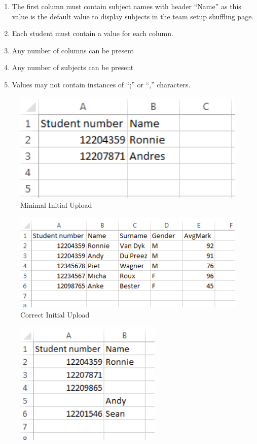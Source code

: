 \begin{enumerate}
\begin{itemize}
\begin{enumerate}
		\item The first column must contain subject names with header ``Name'' as this value is the default value to display subjects in the team setup shuffling page.
		\item Each student must contain a value for each column.
		\item Any number of columns can be present
		\item Any number of subjects can be present
		\item Values may not contain instances of ``;'' or ``,'' characters.
						
	\end{enumerate}
 \begin{figure}[H] 
	\centering
	\includegraphics[width=13cm]{./graphics/MinInitial.png}\par
	\caption{Minimal Initial Upload}
\end{figure}
 \begin{figure}[H] 
	\centering
	\includegraphics[width=13cm]{./graphics/CorrectInitial.png}\par
	\caption{Correct Initial Upload}
\end{figure}
 \begin{figure}[H] 
	\centering
	\includegraphics[width=7cm]{./graphics/IncorrectInitial.png}\par

\end{figure}
\end{itemize}
\end{enumerate}
